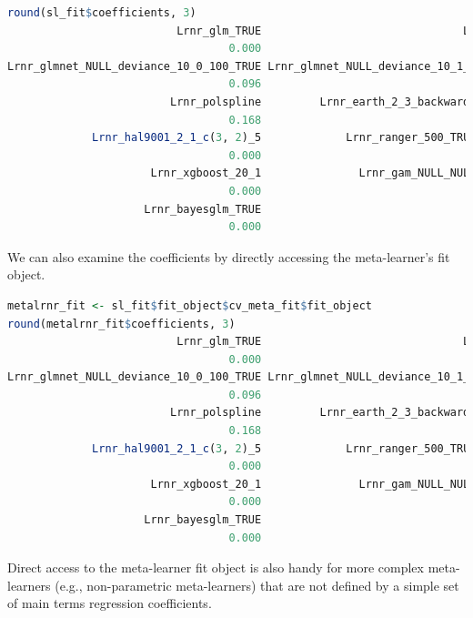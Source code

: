 \documentclass[
  12pt, krantz2,
]{krantz}
\newcommand{\1}{\mathbbm{1}}
\theoremstyle{definition}
\theoremstyle{definition}
\theoremstyle{definition}
\theoremstyle{definition}
\theoremstyle{remark}
\begin{document}
\begin{lstlisting}[language=R]
round(sl_fit$coefficients, 3)
                          Lrnr_glm_TRUE                               Lrnr_mean 
                                  0.000                                   0.000 
Lrnr_glmnet_NULL_deviance_10_0_100_TRUE Lrnr_glmnet_NULL_deviance_10_1_100_TRUE 
                                  0.096                                   0.000 
                         Lrnr_polspline         Lrnr_earth_2_3_backward_0_1_0_0 
                                  0.168                                   0.399 
             Lrnr_hal9001_2_1_c(3, 2)_5             Lrnr_ranger_500_TRUE_none_1 
                                  0.000                                   0.337 
                      Lrnr_xgboost_20_1               Lrnr_gam_NULL_NULL_GCV.Cp 
                                  0.000                                   0.000 
                     Lrnr_bayesglm_TRUE 
                                  0.000 
\end{lstlisting}

We can also examine the coefficients by directly accessing the meta-learner's
fit object.

\begin{lstlisting}[language=R]
metalrnr_fit <- sl_fit$fit_object$cv_meta_fit$fit_object
round(metalrnr_fit$coefficients, 3)
                          Lrnr_glm_TRUE                               Lrnr_mean 
                                  0.000                                   0.000 
Lrnr_glmnet_NULL_deviance_10_0_100_TRUE Lrnr_glmnet_NULL_deviance_10_1_100_TRUE 
                                  0.096                                   0.000 
                         Lrnr_polspline         Lrnr_earth_2_3_backward_0_1_0_0 
                                  0.168                                   0.399 
             Lrnr_hal9001_2_1_c(3, 2)_5             Lrnr_ranger_500_TRUE_none_1 
                                  0.000                                   0.337 
                      Lrnr_xgboost_20_1               Lrnr_gam_NULL_NULL_GCV.Cp 
                                  0.000                                   0.000 
                     Lrnr_bayesglm_TRUE 
                                  0.000 
\end{lstlisting}

Direct access to the meta-learner fit object is also handy for more
complex meta-learners (e.g., non-parametric meta-learners) that are not defined
by a simple set of main terms regression coefficients.
\end{document}
